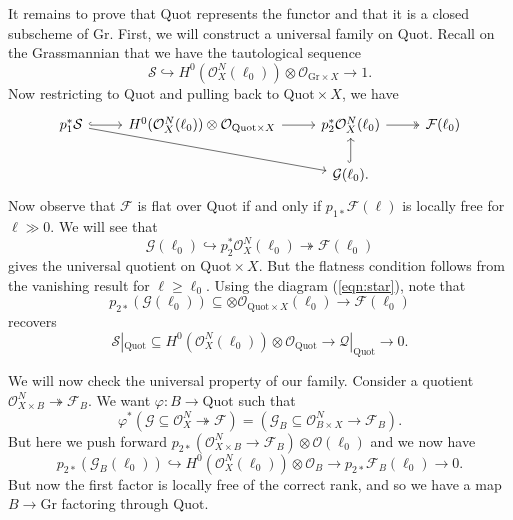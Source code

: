 \documentclass[leqno, openany]{memoir}
\theoremstyle{definition}
\theoremstyle{remark}
\theoremstyle{plain}
\theoremstyle{definition}
\theoremstyle{remark}
\newcommand{\mc}[1]{\mathcal{#1}}
\newcommand{\mr}[1]{\mathrm{#1}}
\begin{document}
It remains to prove that $\mr{Quot}$ represents the functor and that it is a closed subscheme of $\mr{Gr}$. First, we will construct a universal family on $\mr{Quot}$. Recall on the Grassmannian that we have the tautological sequence
\[ \mc{S} \hookrightarrow H^0(\mc{O}_X^N(\ell_0)) \otimes \mc{O}_{\mr{Gr} \times X} \to 1. \]
Now restricting to $\mr{Quot}$ and pulling back to $\mr{Quot} \times X$, we have
\begin{equation}\label{eqn:star}
\begin{tikzcd}
    p_1^* \mc{S} \ar[hookrightarrow]{r} \ar{drr} & H^0(\mc{O}_X^N(\ell_0)) \otimes \mc{O}_{\mr{Quot} \times X} \ar{r} & p_2^* \mc{O}_X^N(\ell_0) \ar[twoheadrightarrow]{r} & \mc{F}(\ell_0) \\
    & & \mc{G}(\ell_0) \ar[hookrightarrow]{u}.
\end{tikzcd}
\end{equation}
Now observe that $\mc{F}$ is flat over $\mr{Quot}$ if and only if $p_{1*} \mc{F}(\ell)$ is locally free for $\ell \gg 0$. We will see that
\[ \mc{G}(\ell_0) \hookrightarrow p_2^* \mc{O}_X^N(\ell_0) \twoheadrightarrow \mc{F}(\ell_0) \]
gives the universal quotient on $\mr{Quot} \times X$. But the flatness condition follows from the vanishing result for $\ell \geq \ell_0$. Using the diagram (\ref{eqn:star}), note that
\[ p_{2*} (\mc{G}(\ell_0)) \subseteq  \otimes \mc{O}_{\mr{Quot} \times X}(\ell_0) \to \mc{F}(\ell_0) \]
recovers
\[ \mc{S}|_{\mr{Quot}} \subseteq H^0(\mc{O}_X^N(\ell_0)) \otimes \mc{O}_{\mr{Quot}} \to \mc{Q} |_{\mr{Quot}} \to 0. \]

We will now check the universal property of our family. Consider a quotient $\mc{O}_{X \times B}^N \twoheadrightarrow \mc{F}_B$. We want $\varphi \colon B \to \mr{Quot}$ such that
\[ \varphi^* (\mc{G} \subseteq \mc{O}_X^N \twoheadrightarrow \mc{F}) = (\mc{G}_B \subseteq \mc{O}_{B \times X}^N \to \mc{F}_B). \]
But here we push forward $p_{2*}(\mc{O}_{X \times B}^N \to \mc{F}_B) \otimes \mc{O}(\ell_0)$ and we now have
\[ p_{2*} (\mc{G}_B(\ell_0)) \hookrightarrow H^0(\mc{O}_X^N(\ell_0)) \otimes \mc{O}_B \to p_{2*} \mc{F}_B(\ell_0) \to 0. \]
But now the first factor is locally free of the correct rank, and so we have a map $B \to \mr{Gr}$ factoring through $\mr{Quot}$.
\end{document}
